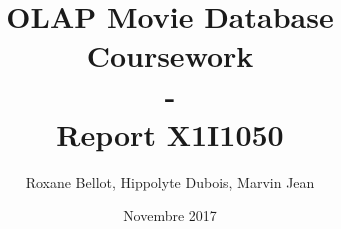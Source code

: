 \documentclass{report}
\begin{document}

\title{OLAP Movie Database Coursework\\
        -\\
        \huge{Report}
        \vskip1cm
        X1I1050
        }
\vskip2cm
\author{Roxane Bellot, Hippolyte Dubois, Marvin Jean}
\date{Novembre 2017}

%

\maketitle
\tableofcontents\begin{flushright}
\end{flushright}




\end{document}
